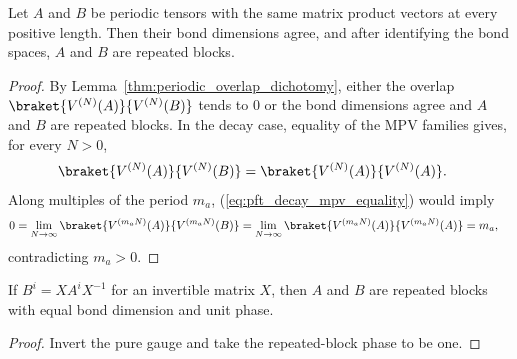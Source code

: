 \begin{lemma}
    \label{thm:peripheral_periodic_ft_proportional_same}
    \leanok
    Let $A$ and $B$ be periodic tensors with the same matrix product vectors
    at every positive length.
    Then their bond dimensions agree, and after identifying the bond spaces,
    $A$ and $B$ are repeated blocks.
\end{lemma}
\begin{proof}\leanok
    By Lemma~\ref{thm:periodic_overlap_dichotomy}, either the overlap
    $\braket{V^{(N)}(A)}{V^{(N)}(B)}$ tends to $0$ or the bond dimensions agree
    and $A$ and $B$ are repeated blocks. In the decay case,
    equality of the MPV families gives, for every $N>0$,
    \begin{align}
        \braket{V^{(N)}(A)}{V^{(N)}(B)}
         & =
        \braket{V^{(N)}(A)}{V^{(N)}(A)}.
        \label{eq:pft_decay_mpv_equality}
    \end{align}
    Along multiples of the period $m_a$, (\ref{eq:pft_decay_mpv_equality})
    would imply
    \begin{align}
        0
         & =
        \lim_{N\to\infty}
        \braket{V^{(m_aN)}(A)}{V^{(m_aN)}(B)}
        =
        \lim_{N\to\infty}
        \braket{V^{(m_aN)}(A)}{V^{(m_aN)}(A)}
        =m_a,
        \notag
    \end{align}
    contradicting $m_a>0$.
\end{proof}

\begin{lemma}
    \label{lem:pure_gauge_het_repeated_blocks}
    \leanok
    If $B^i=XA^iX^{-1}$ for an invertible matrix $X$, then $A$ and $B$ are
    repeated blocks with equal bond dimension and unit phase.
\end{lemma}
\begin{proof}\leanok
    Invert the pure gauge and take the repeated-block phase to be one.
\end{proof}


